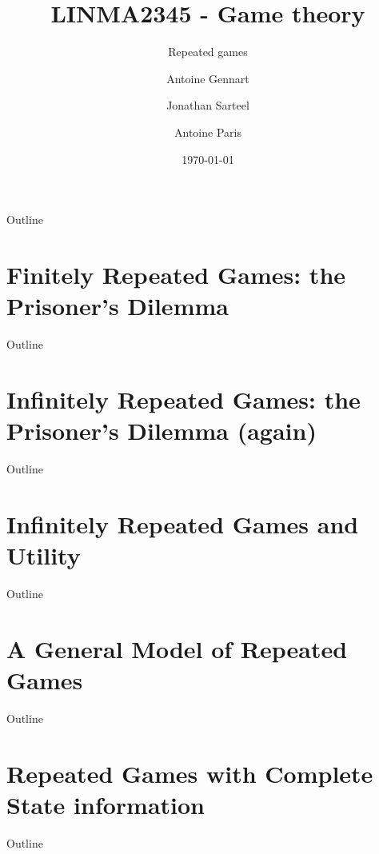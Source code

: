 \documentclass[10pt, handout]{beamer}
\title{LINMA2345 - Game theory}
\subtitle{Repeated games}
\date{\today}
\author{Antoine Gennart\and Jonathan Sarteel\and Antoine Paris}
\institute{Ecole polytechnique de Louvain}
\begin{document}
\maketitle


\begin{frame}{Outline}
    \tableofcontents
\end{frame}

\section{Finitely Repeated Games: the Prisoner's Dilemma}
\begin{frame}{Outline}
    \tableofcontents[currentsection]
\end{frame}



\section{Infinitely Repeated Games: the Prisoner's Dilemma (again)}
\begin{frame}{Outline}
    \tableofcontents[currentsection]
\end{frame}



\section{Infinitely Repeated Games and Utility}
\begin{frame}{Outline}
    \tableofcontents[currentsection]
\end{frame}



\section{A General Model of Repeated Games}
\begin{frame}{Outline}
    \tableofcontents[currentsection]
\end{frame}



\section{Repeated Games with Complete State information}
\begin{frame}{Outline}
    \tableofcontents[currentsection]
\end{frame}
\end{document}

